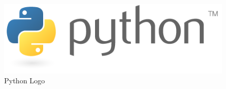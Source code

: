 \begin{figure}[h]
\centering
\includegraphics[scale=0.6]{figures/python.png}
\caption{Python Logo}
\end{figure}

